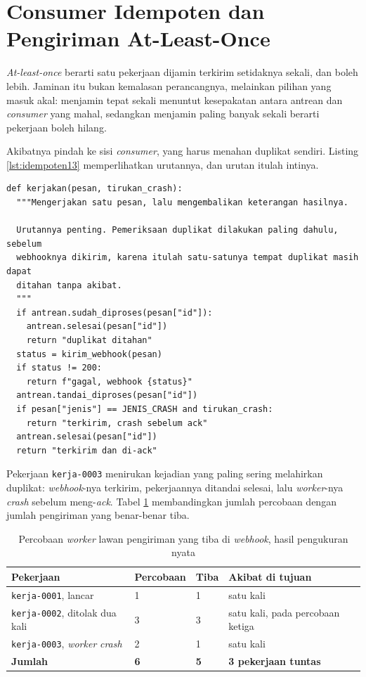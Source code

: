 \section{Consumer Idempoten dan Pengiriman At-Least-Once}

\textit{At-least-once} berarti satu pekerjaan dijamin terkirim setidaknya
sekali, dan boleh lebih. Jaminan itu bukan kemalasan perancangnya, melainkan
pilihan yang masuk akal: menjamin tepat sekali menuntut kesepakatan antara
antrean dan \textit{consumer} yang mahal, sedangkan menjamin paling banyak
sekali berarti pekerjaan boleh hilang.

Akibatnya pindah ke sisi \textit{consumer}, yang harus menahan duplikat
sendiri. Listing \ref{lst:idempoten13} memperlihatkan urutannya, dan urutan
itulah intinya.

\begin{lstlisting}[style=PythonStyle, caption={Pemeriksaan duplikat dilakukan paling dahulu, tersedia di \berkas{sources/chapter13/worker.py}}, label={lst:idempoten13}]
def kerjakan(pesan, tirukan_crash):
  """Mengerjakan satu pesan, lalu mengembalikan keterangan hasilnya.

  Urutannya penting. Pemeriksaan duplikat dilakukan paling dahulu, sebelum
  webhooknya dikirim, karena itulah satu-satunya tempat duplikat masih dapat
  ditahan tanpa akibat.
  """
  if antrean.sudah_diproses(pesan["id"]):
    antrean.selesai(pesan["id"])
    return "duplikat ditahan"
  status = kirim_webhook(pesan)
  if status != 200:
    return f"gagal, webhook {status}"
  antrean.tandai_diproses(pesan["id"])
  if pesan["jenis"] == JENIS_CRASH and tirukan_crash:
    return "terkirim, crash sebelum ack"
  antrean.selesai(pesan["id"])
  return "terkirim dan di-ack"
\end{lstlisting}

Pekerjaan \texttt{kerja-0003} menirukan kejadian yang paling sering
melahirkan duplikat: \textit{webhook}-nya terkirim, pekerjaannya ditandai
selesai, lalu \textit{worker}-nya \textit{crash} sebelum meng-\textit{ack}. Tabel
\ref{tab:atleastonce} membandingkan jumlah percobaan dengan jumlah pengiriman
yang benar-benar tiba.

\begin{table}[!htb]
  \centering
  \caption{Percobaan \textit{worker} lawan pengiriman yang tiba di
           \textit{webhook}, hasil pengukuran nyata}
  \label{tab:atleastonce}
  \begin{tabularx}{\textwidth}{Xlll}
    \hline
    \textbf{Pekerjaan} & \textbf{Percobaan} & \textbf{Tiba} & \textbf{Akibat di tujuan} \\
    \hline
    \texttt{kerja-0001}, lancar & 1 & 1 & satu kali \\
    \hline
    \texttt{kerja-0002}, ditolak dua kali & 3 & 3 & satu kali, pada percobaan ketiga \\
    \hline
    \texttt{kerja-0003}, \textit{worker} \textit{crash} & 2 & 1 & satu kali \\
    \hline
    \textbf{Jumlah} & \textbf{6} & \textbf{5} & \textbf{3 pekerjaan tuntas} \\
    \hline
  \end{tabularx}
\end{table}

